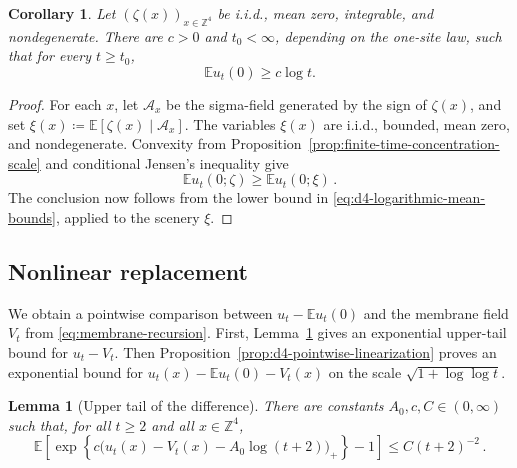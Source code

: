 \documentclass[11pt]{amsart}
\theoremstyle{plain}
\newtheorem{corollary}[theorem]{Corollary}
\newtheorem{lemma}[theorem]{Lemma}
\theoremstyle{definition}
\newcommand{\Z}{\mathbb{Z}}
\newcommand{\E}{\mathbb{E}}
\begin{document}
\begin{corollary}\label{cor:d4-logarithmic-mean-lower}
	Let $(\zeta(x))_{x\in\Z^4}$ be i.i.d., mean zero, integrable, and
	nondegenerate. There are $c>0$ and $t_0<\infty$, depending on the
	one-site law, such that for every $t\geq t_0$,
	\[
		\E u_t(0)\geq c\log t.
	\]
\end{corollary}

\begin{proof}
	For each $x$, let $\mathcal A_x$ be the sigma-field generated by the sign of
	$\zeta(x)$, and set $\xi(x)\coloneqq\E[\zeta(x)\mid\mathcal A_x]$. The
	variables $\xi(x)$ are i.i.d., bounded, mean zero, and nondegenerate.
	Convexity from Proposition~\ref{prop:finite-time-concentration-scale} and
	conditional Jensen's inequality give
	\[
		\E u_t(0;\zeta)\geq\E u_t(0;\xi)\, .
	\]
	The conclusion now follows from the lower bound in
	\eqref{eq:d4-logarithmic-mean-bounds}, applied to the scenery $\xi$.
\end{proof}


	\subsection{Nonlinear replacement}\label{ssec:d4-linearization}
		We obtain a pointwise comparison between $u_t-\E u_t(0)$ and the membrane field $V_t$ from
		\eqref{eq:membrane-recursion}. First,
		Lemma~\ref{lem:d4-difference-tail} gives an exponential upper-tail
		bound for $u_t-V_t$. Then
		Proposition~\ref{prop:d4-pointwise-linearization} proves an exponential bound for
		$u_t(x)-\E u_t(0)-V_t(x)$ on the scale $\sqrt{1+\log\log t}$.  

		\begin{lemma}[Upper tail of the difference]
		\label{lem:d4-difference-tail}
			There are constants $A_0,c,C\in(0,\infty)$ such that, for all
			$t\geq2$ and all $x\in\Z^4$,
			\begin{equation}\label{eq:d4-difference-tail}
				\E\left[
				\exp\left\{
				c\bigl(u_t(x)-V_t(x)-A_0\log(t+2)\bigr)_+
				\right\}
				-1
				\right]
				\leq C(t+2)^{-2}\, .
			\end{equation}
		\end{lemma}
\end{document}
